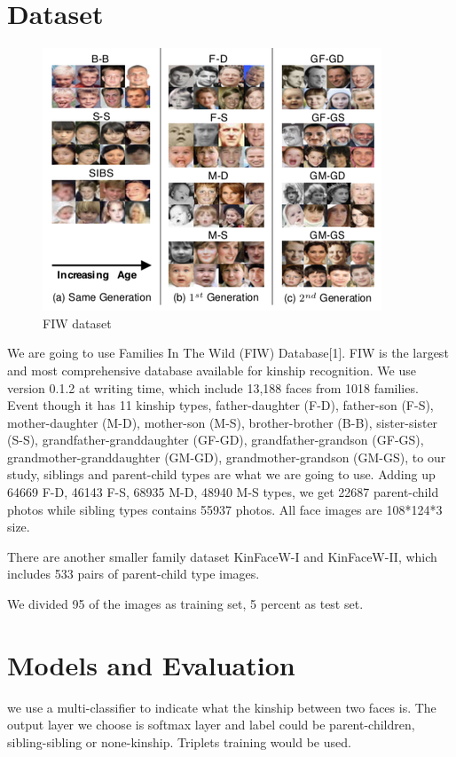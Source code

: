 \documentclass{article}
\begin{document}
\section{Dataset}

\begin{figure}
\includegraphics[width=0.9\linewidth]{facepairs}
\caption{FIW dataset}
\label{fig:wrapfig}
\end{figure}

We are going to use Families In The Wild (FIW) Database[1]. FIW is the largest and
most comprehensive database available for kinship recognition. We use version 0.1.2 at writing time, which include 13,188 faces from 1018 families. Event though it has 11 kinship types, father-daughter (F-D), father-son (F-S), mother-daughter (M-D), mother-son (M-S), brother-brother (B-B), sister-sister (S-S), grandfather-granddaughter (GF-GD), grandfather-grandson (GF-GS),  grandmother-granddaughter (GM-GD), grandmother-grandson (GM-GS), to our study, siblings and parent-child types are what we are going to use. Adding up 64669 F-D, 46143 F-S, 68935 M-D, 48940 M-S types, we get 22687 parent-child photos while sibling types contains 55937 photos. All face images are 108*124*3 size.

There are another smaller family dataset KinFaceW-I and KinFaceW-II, which
includes 533 pairs of parent-child type images.

We divided 95 of the images as training set, 5 percent as test set.

\section{Models and Evaluation}
we use a multi-classifier to indicate what the kinship between two faces is. The
output layer we choose is softmax layer and label could be parent-children,
sibling-sibling or none-kinship.  Triplets training would be used.
\end{document}
